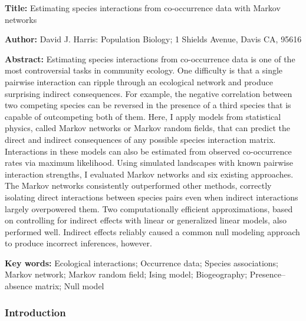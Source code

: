 \documentclass[12pt,]{article}
\date{}
\begin{document}
\begin{spacing}{1.9}
\begin{flushleft}
\renewcommand{\headrulewidth}{0pt}

\setlength{\parskip}{3pt}

\textbf{Title:} Estimating species interactions from co-occurrence data
with Markov networks

\textbf{Author:} David J. Harris: Population Biology; 1 Shields Avenue,
Davis CA, 95616

\textbf{Abstract:} Estimating species interactions from co-occurrence
data is one of the most controversial tasks in community ecology. One
difficulty is that a single pairwise interaction can ripple through an
ecological network and produce surprising indirect consequences. For
example, the negative correlation between two competing species can be
reversed in the presence of a third species that is capable of
outcompeting both of them. Here, I apply models from statistical
physics, called Markov networks or Markov random fields, that can
predict the direct and indirect consequences of any possible species
interaction matrix. Interactions in these models can also be estimated
from observed co-occurrence rates via maximum likelihood. Using
simulated landscapes with known pairwise interaction strengths, I
evaluated Markov networks and six existing approaches. The Markov
networks consistently outperformed other methods, correctly isolating
direct interactions between species pairs even when indirect
interactions largely overpowered them. Two computationally efficient
approximations, based on controlling for indirect effects with linear or
generalized linear models, also performed well. Indirect effects
reliably caused a common null modeling approach to produce incorrect
inferences, however.

\textbf{Key words:} Ecological interactions; Occurrence data; Species
associations; Markov network; Markov random field; Ising model;
Biogeography; Presence--absence matrix; Null model

\subsubsection{Introduction}\label{introduction}

\setlength{\parindent}{1cm}


\end{flushleft}
\end{spacing}
\end{document}
